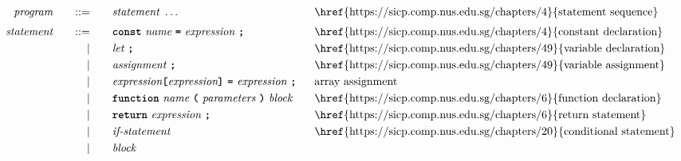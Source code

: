 \begin{alignat*}{9}
&& \textit{program}    &&\quad ::= &\quad && \textit{statement} \ \ldots
                                                           && \textrm{\href{https://sicp.comp.nus.edu.sg/chapters/4}{statement sequence}} \\[1mm]
&& \textit{statement}    &&\quad ::= &\quad && \textbf{\texttt{const}}\  \textit{name} \ 
                                           \textbf{\texttt{=}}\  \textit{expression} \ \textbf{\texttt{;}}
                                                           && \textrm{\href{https://sicp.comp.nus.edu.sg/chapters/4}{constant declaration}} \\
&&                       && |   &\quad && \textit{let} \ \textbf{\texttt{;}}
                                                           && \textrm{\href{https://sicp.comp.nus.edu.sg/chapters/49}{variable declaration}} \\
&&                       && |   &\quad && \textit{assignment} \ \textbf{\texttt{;}}
                                                           && \textrm{\href{https://sicp.comp.nus.edu.sg/chapters/49}{variable assignment}} \\
&&                       && |   &\quad && \textit{expression} \textbf{\texttt{[}}
                                          \textit{expression} \textbf{\texttt{]}} \ 
                                           \textbf{\texttt{=}}\  \textit{expression} \ \textbf{\texttt{;}}
                                                           && \textrm{array assignment} \\
&&                       && |   &\quad && \textbf{\texttt{function}}\  \textit{name} \ 
                                   \textbf{\texttt{(}}\  \textit{parameters} \ \textbf{\texttt{)}}\ \textit{block} \quad
                                                           && \textrm{\href{https://sicp.comp.nus.edu.sg/chapters/6}{function declaration}}\\
&&                       && |   &\quad && \textbf{\texttt{return}}\  \textit{expression} \ \textbf{\texttt{;}}
                                                           && \textrm{\href{https://sicp.comp.nus.edu.sg/chapters/6}{return statement}}\\
&&                       && |   &\quad && \textit{if-statement} \quad
                                                           && \textrm{\href{https://sicp.comp.nus.edu.sg/chapters/20}{conditional statement}}\\
&&                       && |   &\quad &&  \textit{block} 

\end{alignat*}

